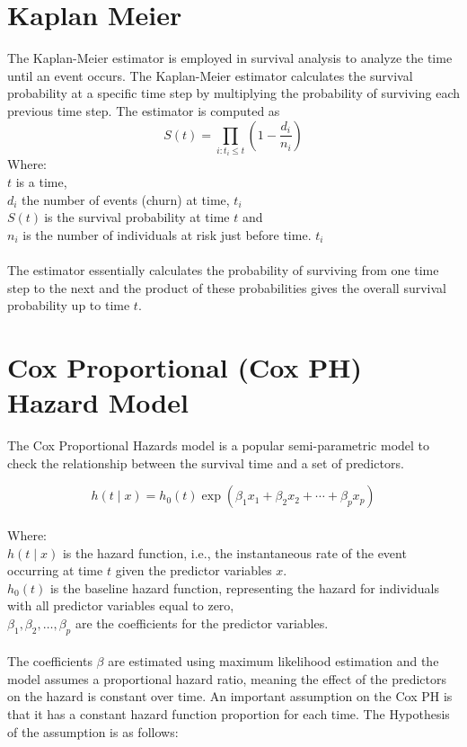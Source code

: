 \documentclass[doublespacing,12pt]{report}
\begin{document}
\section{Kaplan Meier}
The Kaplan-Meier estimator is employed in survival analysis to analyze the time until an event occurs. The Kaplan-Meier estimator calculates the survival probability at a specific time step by multiplying the probability of surviving each previous time step.
The estimator is computed as
\begin{equation}
S\left(t\right)=\prod_{i:t_i\le t}\left(1-\frac{d_i}{n_i}\right)
\end{equation}
Where:\\
     \(t\) is a time,\\
      \(d_i \) the number of events (churn) at time, \(t_i\)\\
      \(S\left(t\right)\ \)is the survival probability at time \(t\) and\\
      \(n_i\) is the number of individuals at risk just before time. \(t_i\)\\
\\ The estimator essentially calculates the probability of surviving from one time step to the next and the product of these probabilities gives the overall survival probability up to time \(t\).

\section{Cox Proportional (Cox PH) Hazard Model}

The Cox Proportional Hazards model is a popular semi-parametric model to check the relationship between the survival time and a set of predictors.

\begin{equation}
h\left(t \mid x\right) = h_0(t) \exp(\beta_1 x_1 + \beta_2 x_2 + \cdots + \beta_p x_p)
\end{equation}\\
Where:\\
\vspace{0.1in}
   \(h(t\mid x)\) is the hazard function, i.e., the instantaneous rate of the event occurring at time \(t\) given the predictor variables \(x\).\\
\vspace{0.1in}
   \(h_0\left(t\right)\) is the baseline hazard function, representing the hazard for individuals with all predictor variables equal to zero,\\
\vspace{0.1in}
     \(\beta_1,\beta_2,\ldots,\beta_p\) are the coefficients for the predictor variables.\\
\vspace{0.1in}
\\ The coefficients \(\beta\) are estimated using maximum likelihood estimation and the model assumes a proportional hazard ratio, meaning the effect of the predictors on the hazard is constant over time.
An important assumption on the Cox PH is that it has a constant hazard function proportion for each time. The Hypothesis of the assumption is as follows: 
\end{document}
